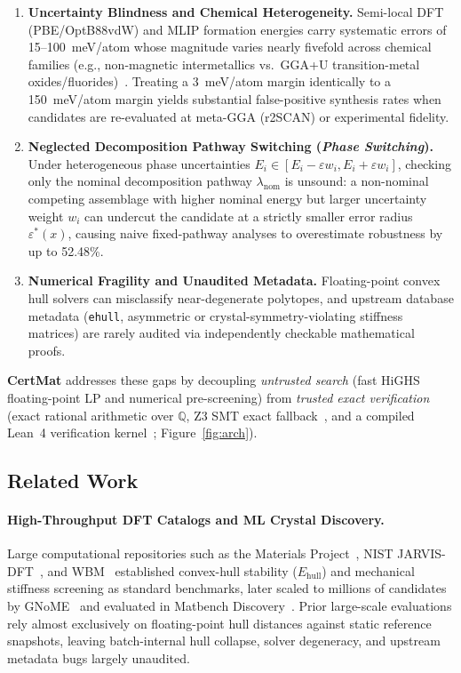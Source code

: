 \documentclass[11pt,a4paper]{article}
\begin{document}
\begin{enumerate}
  \item \textbf{Uncertainty Blindness and Chemical Heterogeneity.} Semi-local DFT (PBE/OptB88vdW) and MLIP formation energies carry systematic errors of 15--100~meV/atom whose magnitude varies nearly fivefold across chemical families (e.g., non-magnetic intermetallics vs.\ GGA+U transition-metal oxides/fluorides)~\cite{wang2021mp2020,kingsbury2022r2scan,bartel2022review}. Treating a 3~meV/atom margin identically to a 150~meV/atom margin yields substantial false-positive synthesis rates when candidates are re-evaluated at meta-GGA (r2SCAN) or experimental fidelity.
  \item \textbf{Neglected Decomposition Pathway Switching (\emph{Phase Switching}).} Under heterogeneous phase uncertainties $E_i \in [E_i - \varepsilon w_i, E_i + \varepsilon w_i]$, checking only the nominal decomposition pathway $\lambda_{\mathrm{nom}}$ is unsound: a non-nominal competing assemblage with higher nominal energy but larger uncertainty weight $w_i$ can undercut the candidate at a strictly smaller error radius $\varepsilon^*(x)$, causing naive fixed-pathway analyses to overestimate robustness by up to 52.48\%.
  \item \textbf{Numerical Fragility and Unaudited Metadata.} Floating-point convex hull solvers can misclassify near-degenerate polytopes, and upstream database metadata (\texttt{ehull}, asymmetric or crystal-symmetry-violating stiffness matrices) are rarely audited via independently checkable mathematical proofs.
\end{enumerate}

\textbf{CertMat} addresses these gaps by decoupling \emph{untrusted search} (fast HiGHS floating-point LP and numerical pre-screening) from \emph{trusted exact verification} (exact rational arithmetic over $\mathbb{Q}$, Z3 SMT exact fallback~\cite{demoura2008z3}, and a compiled Lean~4 verification kernel~\cite{demoura2021lean4}; Figure~\ref{fig:arch}).

\subsection{Related Work}
\paragraph{High-Throughput DFT Catalogs and ML Crystal Discovery.}
Large computational repositories such as the Materials Project~\cite{jain2013mp}, NIST JARVIS-DFT~\cite{choudhary2020jarvis,jarvis_figshare}, and WBM~\cite{wang2021wbm} established convex-hull stability ($E_{\mathrm{hull}}$) and mechanical stiffness screening as standard benchmarks, later scaled to millions of candidates by GNoME~\cite{merchant2023gnome} and evaluated in Matbench Discovery~\cite{riebesell2025matbench}. Prior large-scale evaluations rely almost exclusively on floating-point hull distances against static reference snapshots, leaving batch-internal hull collapse, solver degeneracy, and upstream metadata bugs largely unaudited.
\end{document}
